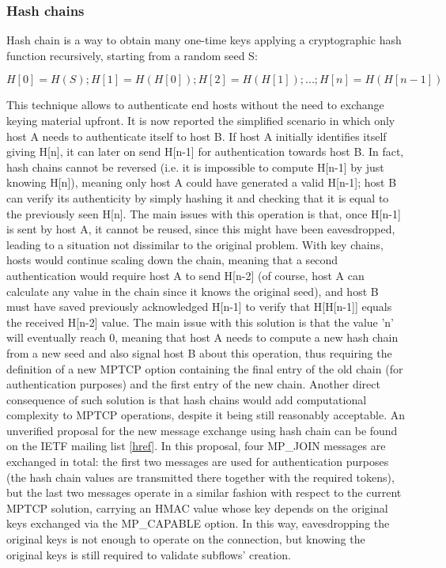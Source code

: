 \subsubsection{Hash chains}
Hash chain is a way to obtain many one-time keys applying a cryptographic hash function recursively, starting from a random seed S:
  
  \[H[0] = H(S); H[1] = H(H[0]); H[2] = H(H[1]); ...; H[n] = H(H[n-1])\]
  
This technique allows to authenticate end hosts without the need to exchange keying material upfront. It is now reported the simplified scenario in which only host A needs to authenticate itself to host B. If host A initially identifies itself giving H[n], it can later on send H[n-1] for authentication towards host B. In fact, hash chains cannot be reversed (i.e. it is impossible to compute H[n-1] by just knowing H[n]), meaning only host A could have generated a valid H[n-1]; host B can verify its authenticity by simply hashing it and checking that it is equal to the previously seen H[n].
  The main issues with this operation is that, once H[n-1] is sent by host A, it cannot be reused, since this might have been eavesdropped, leading to a situation not dissimilar to the original problem. With key chains, hosts would continue scaling down the chain, meaning that a second authentication would require host A to send H[n-2] (of course, host A can calculate any value in the chain since it knows the original seed), and host B must have saved previously acknowledged H[n-1] to verify that H[H[n-1]] equals the received H[n-2] value.
  The main issue with this solution is that the value 'n' will eventually reach 0, meaning that host A needs to compute a new hash chain from a new seed and also signal host B about this operation, thus requiring the definition of a new MPTCP option containing the final entry of the old chain (for authentication purposes) and the first entry of the new chain.
  Another direct consequence of such solution is that hash chains would add computational complexity to MPTCP operations, despite it being still reasonably acceptable.
  An unverified proposal for the new message exchange using hash chain can be found on the IETF mailing list [\href{https://www.ietf.org/mail-archive/web/multipathtcp/current/msg01275.html}{href}].
In this proposal, four MP\_JOIN messages are exchanged in total: the first two messages are used for authentication purposes (the hash chain values are transmitted there together with the required tokens), but the last two messages operate in a similar fashion with respect to the current MPTCP solution, carrying an HMAC value whose key depends on the original keys exchanged via the MP\_CAPABLE option. In this way, eavesdropping the original keys is not enough to operate on the connection, but knowing the original keys is still required to validate subflows' creation.

